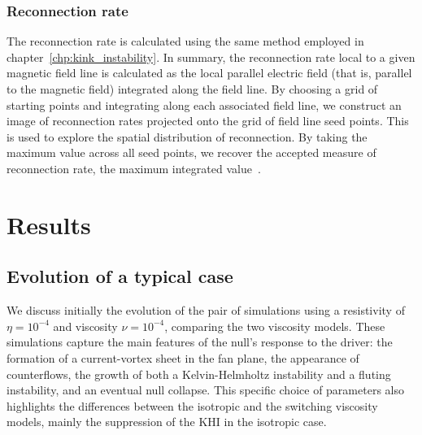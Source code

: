 \subsubsection{Reconnection rate}

The reconnection rate is calculated using the same method employed in chapter~\ref{chp:kink_instability}. In summary, the reconnection rate local to a given magnetic field line is calculated as the local parallel electric field (that is, parallel to the magnetic field) integrated along the field line. By choosing a grid of starting points and integrating along each associated field line, we construct an image of reconnection rates projected onto the grid of field line seed points. This is used to explore the spatial distribution of reconnection. By taking the maximum value across all seed points, we recover the accepted measure of reconnection rate, the maximum integrated value~\cite{galsgaardSteadyStateReconnection2011,priestNatureThreedimensionalMagnetic2003,schindlerGeneralMagneticReconnection1988}.

\section{Results}

\subsection{Evolution of a typical case}
\label{sec:null_point_khi_single_case}

We discuss initially the evolution of the pair of simulations using a resistivity of $\eta = 10^{-4}$ and viscosity $\nu = 10^{-4}$, comparing the two viscosity models. These simulations capture the main features of the null's response to the driver: the formation of a current-vortex sheet in the fan plane, the appearance of counterflows, the growth of both a Kelvin-Helmholtz instability and a fluting instability, and an eventual null collapse. This specific choice of parameters also highlights the differences between the isotropic and the switching viscosity models, mainly the suppression of the KHI in the isotropic case.

